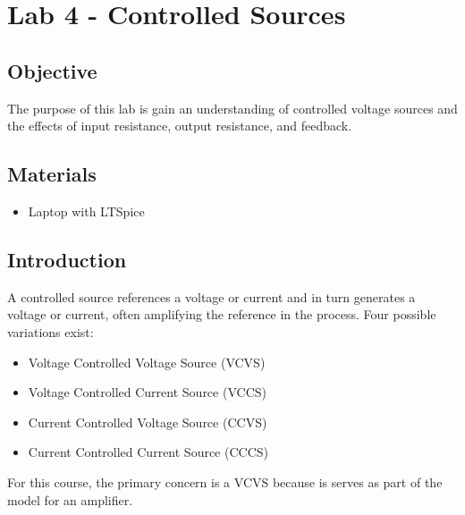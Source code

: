 \chapter{Lab 4 - Controlled Sources}

\section{Objective}

The purpose of this lab is gain an understanding of controlled voltage sources and the effects of input resistance, output resistance, and feedback. 

\section{Materials}

\begin{itemize}
	\item Laptop with LTSpice
\end{itemize}

\section{Introduction}

A controlled source references a voltage or current and in turn generates a voltage or current, often amplifying the reference in the process. Four possible variations exist: 
	\begin{itemize}
		\item Voltage Controlled Voltage Source (VCVS)
		\item Voltage Controlled Current Source (VCCS)
		\item Current Controlled Voltage Source (CCVS)
		\item Current Controlled Current Source (CCCS)
	\end{itemize}
\noindent For this course, the primary concern is a VCVS because is serves as part of the model for an amplifier. 

